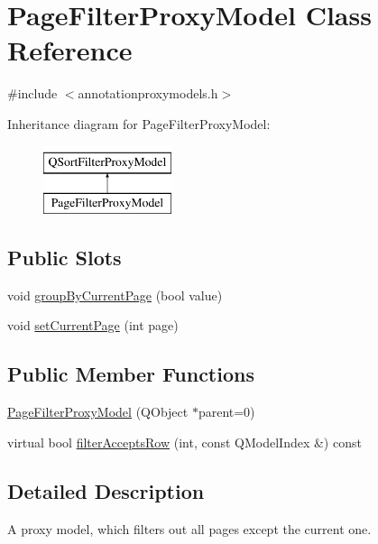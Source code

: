 \hypertarget{classPageFilterProxyModel}{\section{Page\+Filter\+Proxy\+Model Class Reference}
\label{classPageFilterProxyModel}
}


{\ttfamily \#include $<$annotationproxymodels.\+h$>$}

Inheritance diagram for Page\+Filter\+Proxy\+Model\+:\begin{figure}[H]
\begin{center}
\leavevmode
\includegraphics[height=2.000000cm]{classPageFilterProxyModel}
\end{center}
\end{figure}
\subsection*{Public Slots}
\begin{DoxyCompactItemize}
\item 
void \hyperlink{classPageFilterProxyModel_a8bf420622ac83b8aee33f459907552b9}{group\+By\+Current\+Page} (bool value)
\item 
void \hyperlink{classPageFilterProxyModel_a68ba3ca58f7d8a4e921d08596bf3f7de}{set\+Current\+Page} (int page)
\end{DoxyCompactItemize}
\subsection*{Public Member Functions}
\begin{DoxyCompactItemize}
\item 
\hyperlink{classPageFilterProxyModel_a23bcd2b5990f9ed86e3ad21dcb11554e}{Page\+Filter\+Proxy\+Model} (Q\+Object $\ast$parent=0)
\item 
virtual bool \hyperlink{classPageFilterProxyModel_a2f0524365f9965aa1d6455bcea52f4b0}{filter\+Accepts\+Row} (int, const Q\+Model\+Index \&) const 
\end{DoxyCompactItemize}


\subsection{Detailed Description}
A proxy model, which filters out all pages except the current one. 

